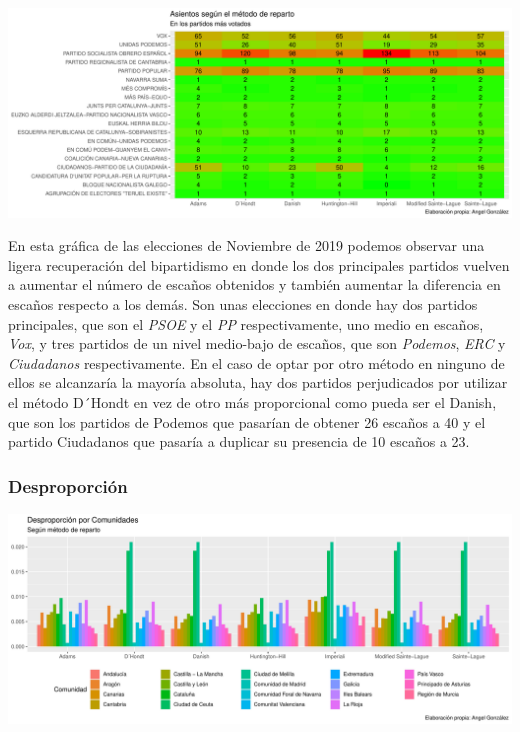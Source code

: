 \documentclass[12pt,a4paper,]{book}
\numberwithin{dummy}{section}
\theoremstyle{ocrenumbox}
\theoremstyle{blacknumex}
\theoremstyle{blacknumbox}
\theoremstyle{ocrenum}
\theoremstyle{ocrenum}
\begin{document}
\begin{center}\includegraphics[width=0.95\linewidth]{figurasR/unnamed-chunk-188-2} \end{center}

En esta gráfica de las elecciones de Noviembre de 2019 podemos observar
una ligera recuperación del bipartidismo en donde los dos principales
partidos vuelven a aumentar el número de escaños obtenidos y también
aumentar la diferencia en escaños respecto a los demás. Son unas
elecciones en donde hay dos partidos principales, que son el \emph{PSOE}
y el \emph{PP} respectivamente, uno medio en escaños, \emph{Vox}, y tres
partidos de un nivel medio-bajo de escaños, que son \emph{Podemos},
\emph{ERC} y \emph{Ciudadanos} respectivamente. En el caso de optar por
otro método en ninguno de ellos se alcanzaría la mayoría absoluta, hay
dos partidos perjudicados por utilizar el método D´Hondt en vez de otro
más proporcional como pueda ser el Danish, que son los partidos de
Podemos que pasarían de obtener 26 escaños a 40 y el partido Ciudadanos
que pasaría a duplicar su presencia de 10 escaños a 23.

\hypertarget{desproporciuxf3n-14}{%
\subsubsection{Desproporción}\label{desproporciuxf3n-14}}

\begin{center}\includegraphics[width=0.95\linewidth]{figurasR/unnamed-chunk-189-1} \end{center}
\end{document}
